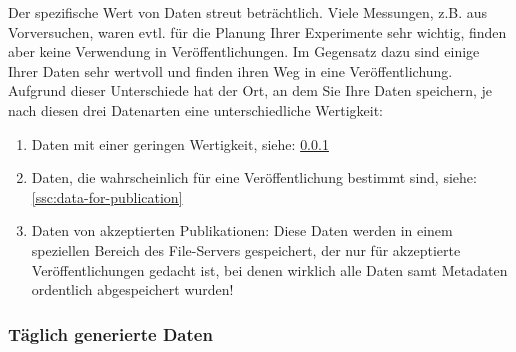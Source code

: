 Der spezifische Wert von Daten streut beträchtlich. Viele Messungen,
z.B. aus Vorversuchen, waren evtl. für die Planung Ihrer Experimente sehr
wichtig, finden aber keine Verwendung in Veröffentlichungen. Im Gegensatz dazu
sind einige Ihrer Daten sehr wertvoll und finden ihren Weg in eine
Veröffentlichung. Aufgrund dieser Unterschiede hat der Ort, an dem Sie Ihre
Daten speichern, je nach diesen drei Datenarten eine unterschiedliche
Wertigkeit:
\begin{enumerate}[label=\Roman*.]
  \item Daten mit einer geringen Wertigkeit, siehe:
       \ref{ssc:daily-data} 
  \item Daten, die wahrscheinlich für eine Veröffentlichung bestimmt sind,
        siehe:
        \ref{ssc:data-for-publication} 
  \item Daten von akzeptierten Publikationen: Diese Daten werden in einem
        speziellen Bereich des File-Servers gespeichert, der nur für akzeptierte
        Veröffentlichungen gedacht ist, bei denen wirklich alle Daten samt Metadaten ordentlich abgespeichert wurden!
\end{enumerate}

\subsubsection{Täglich generierte Daten}\label{ssc:daily-data}

